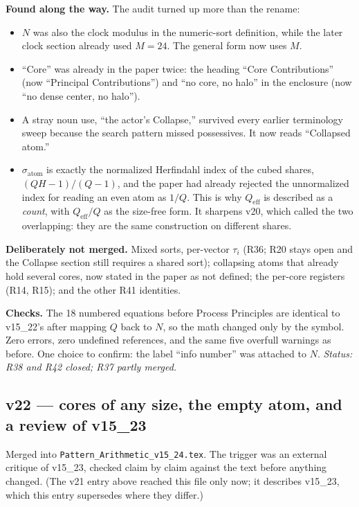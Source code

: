 \documentclass[11pt]{article}
\begin{document}
\textbf{Found along the way.} The audit turned up more than the rename:
\begin{itemize}
\item $N$ was also the clock modulus in the numeric-sort definition,
while the later clock section already used $M=24$. The general form now
uses $M$.
\item ``Core'' was already in the paper twice: the heading ``Core
Contributions'' (now ``Principal Contributions'') and ``no core, no
halo'' in the enclosure (now ``no dense center, no halo'').
\item A stray noun use, ``the actor's Collapse,'' survived every
earlier terminology sweep because the search pattern missed
possessives. It now reads ``Collapsed atom.''
\item $\sigma_{\text{atom}}$ is exactly the normalized Herfindahl index
of the cubed shares, $(QH-1)/(Q-1)$, and the paper had already
rejected the unnormalized index for reading an even atom as $1/Q$. This
is why $Q_{\mathrm{eff}}$ is described as a \emph{count}, with
$Q_{\mathrm{eff}}/Q$ as the size-free form. It sharpens v20, which
called the two overlapping: they are the same construction on different
shares.
\end{itemize}

\textbf{Deliberately not merged.} Mixed sorts, per-vector $\tau_i$
(R36; R20 stays open and the Collapse section still requires a shared
sort); collapsing atoms that already hold several cores, now stated in
the paper as not defined; the per-core registers (R14, R15); and the
other R41 identities.

\textbf{Checks.} The 18 numbered equations before Process Principles
are identical to v15\_22's after mapping $Q$ back to $N$, so the math
changed only by the symbol. Zero errors, zero undefined references, and
the same five overfull warnings as before. One choice to confirm: the
label ``info number'' was attached to $N$.
\emph{Status: R38 and R42 closed; R37 partly merged.}


\subsection*{v22 --- cores of any size, the empty atom, and a review of v15\_23}
Merged into \texttt{Pattern\_Arithmetic\_v15\_24.tex}. The trigger was an
external critique of v15\_23, checked claim by claim against the text
before anything changed. (The v21 entry above reached this file only
now; it describes v15\_23, which this entry supersedes where they
differ.)
\end{document}
